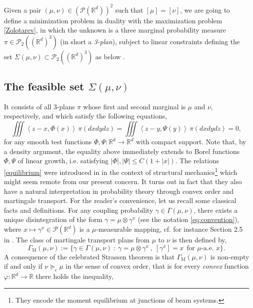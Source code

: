\documentclass[11pt,reqno]{amsart}
\theoremstyle{definition}
\numberwithin{equation}{section}
\newcommand{\R}{\mathbb{R}}
\newcommand{\Rd}{{\R^d}}
\newcommand{\PP}{\mathcal{P}}
\newcommand{\pairing}[1]{{\left \langle #1 \right \rangle}}
\begin{document}
Given a pair  $(\mu,\nu)\in (\PP(\R^d))^2$ such that $[\mu] = [\nu]$, we are going to define a minimization problem in duality with the maximization problem \eqref{Zolotarev}, in which the unknown is a three marginal probability measure $\pi\in  \PP_2((\Rd)^3)$ (in short a  \emph{3-plan}), subject to linear constraints defining the set  $\Sigma(\mu,\nu)\subset \PP_2((\Rd)^3)$ as below .

\subsection{The feasible set $\Sigma(\mu,\nu)$}  It consists of all 3-plans $\pi$ whose first and second marginal is
$\mu$ and $\nu$, respectively, and which satisfy the following  equations,
\begin{equation}\label{equilibrium}
	\iiint \! \pairing{z-x, \Phi(x)} \, \pi(dxdydz)  = \iiint \! \pairing{z-y, \Psi(y)} \, \pi(dxdydz) =0,
\end{equation}
for any smooth test functions $\Phi,\Psi: \Rd \to \Rd$ with compact support.
Note that, by a density argument,  the equality above immediately extends to Borel functions $\Phi, \Psi$ of linear growth, i.e. satisfying $|\Phi|,|\Psi|\le C (1+ |x|)  .$
 The relations \eqref{equilibrium} were  introduced in \cite{bolbou2024} in  the context of structural mechanics\footnote{They encode the moment equilibrium at junctions of beam systems.}
which might seem remote from our present concern.  It turns out  in fact that they also have a natural  interpretation in probability theory through convex order and martingale transport.
 For the reader's convenience, let us recall some classical facts and  definitions. For any  coupling probability  $\gamma \in \Gamma(\mu,\nu)$, there exists a unique disintegration of the form $\gamma = \mu \otimes \gamma^x$ (see the notation \eqref{eq:convention}), where $x \mapsto \gamma^x \in \PP(\Rd)$ is a $\mu$-measurable  mapping, cf. for instance Section 2.5 in \cite{ambrosio2000}. The class of martingale transport plans from $\mu$ to $\nu$ is then defined by,
\begin{equation}\label{def:martingale}
\Gamma_{\mathrm{M}}(\mu,\nu) := \Big \{ \gamma\in \Gamma(\mu,\nu) \ :\  \gamma=\mu \otimes \gamma^x \ ,\  [\gamma^x] = x   \ \ \text{for $\mu$-a.e. $x$}  \Big\} .
 \end{equation} 
  A consequence  of the celebrated Strassen theorem \cite{Strassen-1965}
 is that   $\Gamma_{\mathrm{M}}(\mu,\nu)$ is non-empty if and only if $\nu  \succeq_c \mu$ in the sense of convex order, that is for every \emph{convex} function $\varphi:\R^d \to \R$ there holds the inequality,
\end{document}
